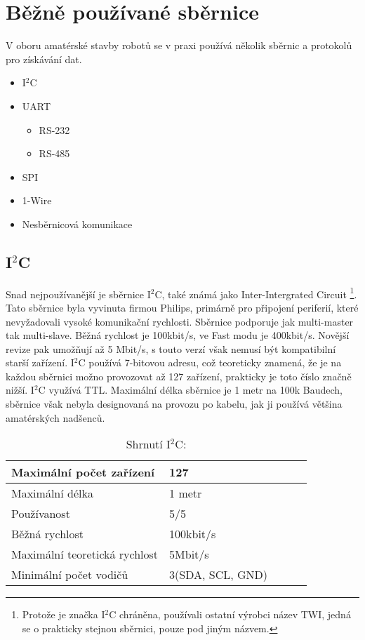 \chapter{Běžně používané sběrnice}
V oboru amatérské stavby robotů se v praxi používá několik sběrnic a protokolů pro získávání dat.
\begin{itemize}
	\item I$^{2}$C
	\item UART
	      \begin{itemize}
		      \item RS-232
		      \item RS-485
	      \end{itemize}
	\item SPI
	\item 1-Wire
	\item Nesběrnicová komunikace
\end{itemize}

\section{I$^{2}$C}
Snad nejpoužívanější je sběrnice I$^{2}$C,
také známá jako Inter-Intergrated Circuit
\footnote{ Protože je značka I$^{2}$C chráněna, používali ostatní výrobci název TWI, jedná se o prakticky stejnou sběrnici, pouze pod jiným názvem.}.
Tato sběrnice byla vyvinuta firmou Philips, primárně pro připojení periferií, které nevyžadovali vysoké komunikační rychlosti.
Sběrnice podporuje jak multi-master tak multi-slave.
Běžná rychlost je 100kbit/s, ve Fast modu je 400kbit/s. Novější revize pak umožňují až 5 Mbit/s, s touto verzí však nemusí být kompatibilní starší zařízení.
I$^{2}$C používá 7-bitovou adresu, což teoreticky znamená, že je na každou sběrnici možno provozovat až 127 zařízení, prakticky je toto číslo značně nižší.
I$^{2}$C využívá TTL.
Maximální délka sběrnice je 1 metr na 100k Baudech, sběrnice však nebyla designovaná na provozu po kabelu, jak ji používá většina amatérských nadšenců.\cite{nxp:UM10204}

\begin{table}[]
	\caption{Shrnutí I$^{2}$C:}
	\centering
	\begin{tabular}{|l|l|l|l|l|} \hline
		Maximální počet zařízení      & 127              \\ \hline
		Maximální délka               & 1 metr           \\ \hline
		Používanost                   & 5/5              \\ \hline
		Běžná rychlost                & 100kbit/s        \\ \hline
		Maximální teoretická rychlost & 5Mbit/s          \\ \hline
		Minimální počet vodičů        & 3(SDA, SCL, GND) \\ \hline
	\end{tabular}
\end{table}



